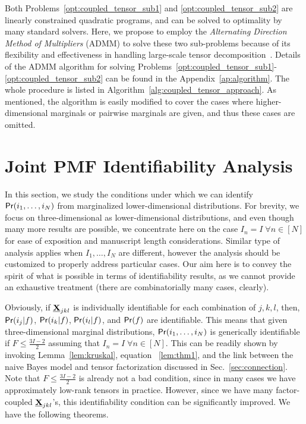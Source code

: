 \documentclass[journal]{IEEEtran}
\begin{document}
Both Problems~\eqref{opt:coupled_tensor_sub1} and \eqref{opt:coupled_tensor_sub2} are linearly constrained quadratic programs, and can be solved to optimality by many standard solvers. Here, we propose to employ the {\it Alternating Direction Method of Multipliers} (ADMM) to solve these two sub-problems because of its flexibility and effectiveness in handling large-scale tensor decomposition~\cite{HuSiLi2016,FuHuMa2015}. Details of the ADMM algorithm for solving Problems~\eqref{opt:coupled_tensor_sub1}-\eqref{opt:coupled_tensor_sub2} can be found in the Appendix~\ref{ap:algorithm}.
The whole procedure is listed in Algorithm~\ref{alg:coupled_tensor_approach}. As mentioned, the algorithm is easily modified to cover the cases where { higher-dimensional} marginals or pairwise marginals are given, and thus these cases are omitted.

\section{{ Joint PMF} Identifiability Analysis}\label{sec:ident}

In this section, we study the conditions under which we can identify ${\sf Pr}(i_1,\ldots,i_N)$ from marginalized {lower-dimensional} distributions. For brevity, we focus on  {three-dimensional as lower-dimensional} distributions, and even though many more results are possible, we concentrate here on the case $I_n=I \; \forall n \in[N]$ for ease of exposition and manuscript length considerations. Similar type of analysis applies when $I_1,\ldots,I_N$ are different, however the analysis should be customized to properly address particular cases. Our aim here is to convey the spirit of what is possible in terms of identifiability results, as we cannot provide an exhaustive treatment (there are combinatorially many cases, clearly). 

Obviously, if $\underline{\bf X}_{jkl}$ is individually identifiable for each combination of $j,k,l$, then, ${\sf Pr}(i_j|f)$, ${\sf Pr}(i_k|f)$, ${\sf Pr}(i_l|f)$, and ${\sf Pr}(f)$ are identifiable. This means that given  {three-dimensional marginal distributions}, ${\sf Pr}(i_1,\ldots,i_N)$ is generically identifiable if $F \leq \frac{3I-2}{2}$ assuming that $I_n = I \; \forall n \in[N]$. This can be readily shown by invoking Lemma~\ref{lem:kruskal}, equation ~\eqref{lem:thm1}, and the link between the naive Bayes model and tensor factorization discussed in Sec.~\ref{sec:connection}. Note that $F \leq \frac{3I-2}{2}$ is already not a bad condition, since in many cases we have approximately low-rank tensors in practice. However, since we have many factor-coupled $\underline{\bf X}_{jkl}$'s, this identifiability condition can be significantly improved. We have the following theorems.
\end{document}
